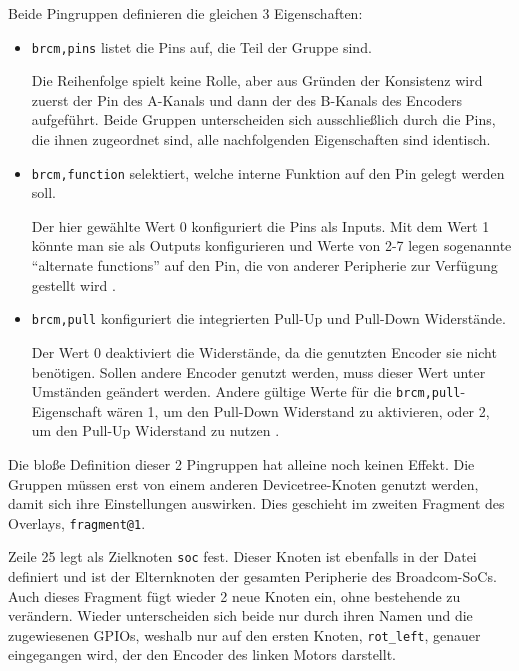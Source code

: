 \documentclass[german]{thesis_KBS}
\newcommand{\code}[1]{\texttt{#1}}  %
\begin{document}
Beide Pingruppen definieren die gleichen 3 Eigenschaften:

\begin{itemize}
    \item \code{brcm,pins} listet die Pins auf, die Teil der Gruppe sind.

    Die Reihenfolge spielt keine Rolle, aber aus Gründen der Konsistenz wird
    zuerst der Pin des A-Kanals und dann der des B-Kanals des Encoders
    aufgeführt. Beide Gruppen unterscheiden sich ausschließlich durch die Pins,
    die ihnen zugeordnet sind, alle nachfolgenden Eigenschaften sind identisch.

    \item \code{brcm,function} selektiert, welche interne Funktion auf den Pin
    gelegt werden soll.

    Der hier gewählte Wert 0 konfiguriert die Pins als Inputs. Mit dem Wert 1
    könnte man sie als Outputs konfigurieren und Werte von 2-7 legen sogenannte
    "`alternate functions"' auf den Pin, die von anderer Peripherie zur
    Verfügung gestellt wird \cite{devicetree-bcmgpio}.

    \item \code{brcm,pull} konfiguriert die integrierten Pull-Up und Pull-Down
    Widerstände.

    Der Wert 0 deaktiviert die Widerstände, da die genutzten Encoder sie nicht
    benötigen. Sollen andere Encoder genutzt werden, muss dieser Wert unter
    Umständen geändert werden. Andere gültige Werte für die
    \code{brcm,pull}-Eigenschaft wären 1, um den Pull-Down Widerstand zu
    aktivieren, oder 2, um den Pull-Up Widerstand zu nutzen
    \cite{devicetree-bcmgpio}.
\end{itemize}

Die bloße Definition dieser 2 Pingruppen hat alleine noch keinen Effekt. Die
Gruppen müssen erst von einem anderen Devicetree-Knoten genutzt werden, damit
sich ihre Einstellungen auswirken. Dies geschieht im zweiten Fragment des
Overlays, \code{fragment@1}.

Zeile 25 legt als Zielknoten \code{soc} fest. Dieser Knoten ist ebenfalls in der
Datei  definiert und ist der Elternknoten
der gesamten Peripherie des Broadcom-SoCs. Auch dieses Fragment fügt wieder 2
neue Knoten ein, ohne bestehende zu verändern. Wieder unterscheiden sich beide
nur durch ihren Namen und die zugewiesenen GPIOs, weshalb nur auf den ersten
Knoten, \code{rot\_left}, genauer eingegangen wird, der den Encoder des linken
Motors darstellt.
\end{document}
